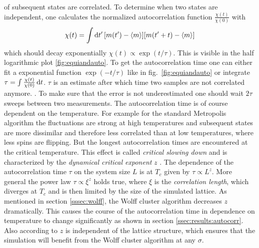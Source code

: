         of subsequent states are correlated. To determine when two states
        are independent, one calculates the normalized autocorrelation function
        \(\frac{\chi(t)}{\chi(0)}\) with
        \begin{equation}
            \chi(t) = \int \mathrm{d} t' \, [m(t') -\left< m \right>][m(t'+t)-\left< m \right>]
        \end{equation}
        which should decay exponentially
        \(\chi(t) \propto \exp(t/\tau)\). This is visible in the half
        logarithmic plot \ref{fig:equiandauto}.
        To get the autocorrelation time one can either fit a exponential
        function \(\exp(-t/\tau)\) like in fig.\ \ref{fig:equiandauto}
        or integrate \(\tau = \int \frac{\chi(t)}{\chi(0)} \,\mathrm{d} t\).
        \(\tau\) is an estimate after which time two samples are not
        correlated anymore. \cite[p. 59ff]{NewmanBarkema1999} \cite[p. 150f]{Katzgraber2011}.
        To make sure that the error is not underestimated one should wait
        \(2\tau\) sweeps between two measurements.
        The autocorrelation time is of course dependent on the temperature.
        For example for the standard Metropolis algorithm the fluctuations
        are strong at high temperatures and subsequent
        states are more dissimilar and therefore less correlated than at low
        temperatures, where less spins are flipping. But the longest
        autocorrelation times are encountered at the critical temperature.
        This effect is called \emph{critical slowing down} and is
        characterized by the \emph{dynamical critical exponent} \(z\)
        \cite{SwendsenWang1987}. The dependence of the autocorrelation time
        \(\tau\) on the system size \(L\) is at \(T_{c}\) given by \(\tau \propto L^z\).
        More general the power law \(\tau \propto \xi^z\) holds true, where
        \(\xi\) is the \emph{correlation length}, which diverges at
        \(T_{c}\) and is then limited by the size of the simulated lattice.
        As mentioned in section \ref{sssec:wolff}, the Wolff cluster algorithm
        decreases \(z\) dramatically. This causes the course of the autocorrelation
        time in dependence on temperature to change significantly as shown in
        section \ref{ssec:results:autocorr}. Also according to \cite{NewmanBarkema1999}
        \(z\) is independent of the lattice structure, which ensures that
        the simulation will benefit from the Wolff cluster algorithm at
        any \(\sigma\).
